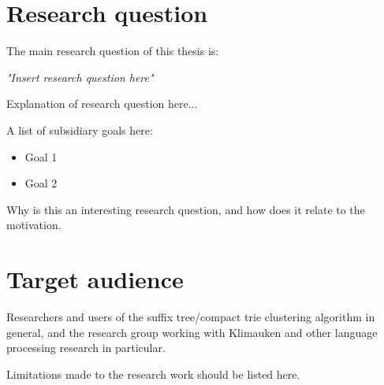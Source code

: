 
\section{Research question}
The main research question of this thesis is:

\emph{"Insert research question here"}

Explanation of research question here...

A list of subsidiary goals here:

\begin{itemize}
	\item Goal 1
	\item Goal 2
\end{itemize}

Why is this an interesting research question, and how does it relate to the motivation.

\section{Target audience}
Researchers and users of the suffix tree/compact trie clustering algorithm in general, and the research group working with Klimauken and other language processing research in particular.

Limitations made to the research work should be listed here.